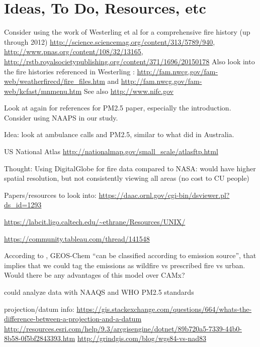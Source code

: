 \section{Ideas, To Do, Resources, etc}

Consider using the work of Westerling et al for a comprehensive fire history (up through 2012) \url{http://science.sciencemag.org/content/313/5789/940}, \url{http://www.pnas.org/content/108/32/13165}, \url{http://rstb.royalsocietypublishing.org/content/371/1696/20150178} \cite{westerling_increasing_2016,WesterlingCorrection2016} Also look into the fire histories referenced in Westerling \cite{westerling_increasing_2016,WesterlingCorrection2016}: \url{http://fam.nwcg.gov/fam-web/weatherfirecd/fire_files.htm} and \url{http://fam.nwcg.gov/fam-web/kcfast/mnmenu.htm} See also \url{http://www.nifc.gov}

Look at \cite{kollanus_effects_2016} again for references for PM2.5 paper, especially the introduction. Consider using NAAPS in our study. 

Idea: look at ambulance calls and PM2.5, similar to what \cite{salimi_ambient_2016} did in Australia.

US National Atlas \url{http://nationalmap.gov/small_scale/atlasftp.html}

Thought: Using DigitalGlobe for fire data compared to NASA: would have higher spatial resolution, but not consistently viewing all areas (no cost to CU people) 


Papers/resources to look into: \url{https://daac.ornl.gov/cgi-bin/dsviewer.pl?ds_id=1293}

\url{https://labcit.ligo.caltech.edu/~ethrane/Resources/UNIX/}

\url{https://community.tableau.com/thread/141548}

According to \cite{liu_particulate_2016}, GEOS-Chem ``can be classified according to emission source'', that implies that we could tag the emissions as wildfire vs prescribed fire vs urban. Would there be any advantages of this model over CAMx?

could analyze data with NAAQS and WHO PM2.5 standards

projection/datum info: \url{https://gis.stackexchange.com/questions/664/whats-the-difference-between-a-projection-and-a-datum}
\url{http://resources.esri.com/help/9.3/arcgisengine/dotnet/89b720a5-7339-44b0-8b58-0f5bf2843393.htm}
\url{http://grindgis.com/blog/wgs84-vs-nad83}

